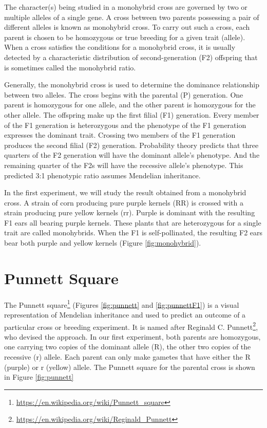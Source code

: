 \documentclass[]{book}
\let\rmarkdownfootnote\footnote%
\def\footnote{\protect\rmarkdownfootnote}
\renewcommand{\href}[2]{#2\footnote{\url{#1}}}
\theoremstyle{definition}
\theoremstyle{definition}
\theoremstyle{definition}
\theoremstyle{remark}
\begin{document}
The character(s) being studied in a monohybrid cross are governed by two
or multiple alleles of a single gene. A cross between two parents
possessing a pair of different alleles is known as monohybrid cross. To
carry out such a cross, each parent is chosen to be homozygous or true
breeding for a given trait (allele). When a cross satisfies the
conditions for a monohybrid cross, it is usually detected by a
characteristic distribution of second-generation (F2) offspring that is
sometimes called the monohybrid ratio.

Generally, the monohybrid cross is used to determine the dominance
relationship between two alleles. The cross begins with the parental (P)
generation. One parent is homozygous for one allele, and the other
parent is homozygous for the other allele. The offspring make up the
first filial (F1) generation. Every member of the F1 generation is
heterozygous and the phenotype of the F1 generation expresses the
dominant trait. Crossing two members of the F1 generation produces the
second filial (F2) generation. Probability theory predicts that three
quarters of the F2 generation will have the dominant allele's phenotype.
And the remaining quarter of the F2s will have the recessive allele's
phenotype. This predicted 3:1 phenotypic ratio assumes Mendelian
inheritance.

In the first experiment, we will study the result obtained from a
monohybrid cross. A strain of corn producing pure purple kernels (RR) is
crossed with a strain producing pure yellow kernels (rr). Purple is
dominant with the resulting F1 ears all bearing purple kernels. These
plants that are heterozygous for a single trait are called monohybrids.
When the F1 is self-pollinated, the resulting F2 ears bear both purple
and yellow kernels (Figure \ref{fig:monohybrid}).

\section{Punnett Square}\label{punnett-square}

The \href{https://en.wikipedia.org/wiki/Punnett_square}{Punnett square}
(Figures \ref{fig:punnett} and \ref{fig:punnettF1}) is a visual
representation of Mendelian inheritance and used to predict an outcome
of a particular cross or breeding experiment. It is named after
\href{https://en.wikipedia.org/wiki/Reginald_Punnett}{Reginald C.
Punnett}, who devised the approach. In our first experiment, both
parents are homozygous, one carrying two copies of the dominant allele
(R), the other two copies of the recessive (r) allele. Each parent can
only make gametes that have either the R (purple) or r (yellow) allele.
The Punnett square for the parental cross is shown in Figure
\ref{fig:punnett}
\end{document}
